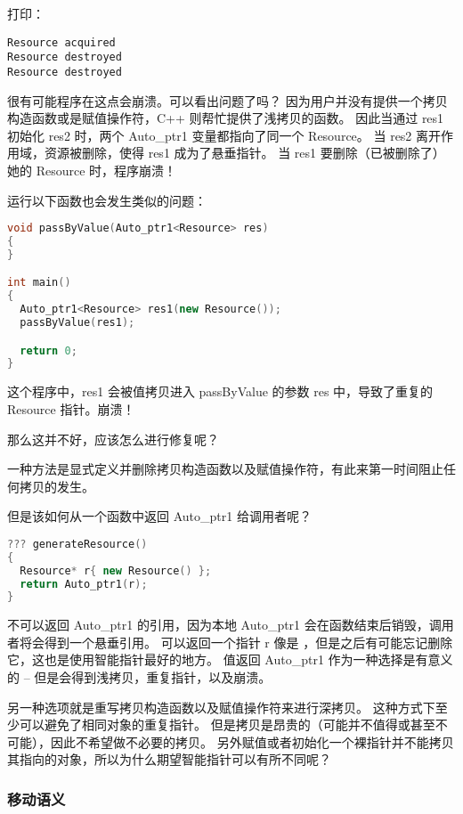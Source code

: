 \documentclass[../../LearnCpp.tex]{subfiles}
\begin{document}
打印：

\begin{lstlisting}
Resource acquired
Resource destroyed
Resource destroyed
\end{lstlisting}

很有可能程序在这点会崩溃。可以看出问题了吗？
因为用户并没有提供一个拷贝构造函数或是赋值操作符，C++ 则帮忙提供了浅拷贝的函数。
因此当通过 res1 初始化 res2 时，两个 Auto\_ptr1 变量都指向了同一个 Resource。
当 res2 离开作用域，资源被删除，使得 res1 成为了悬垂指针。
当 res1 要删除（已被删除了）她的 Resource 时，程序崩溃！

运行以下函数也会发生类似的问题：

\begin{lstlisting}[language=C++]
void passByValue(Auto_ptr1<Resource> res)
{
}

int main()
{
  Auto_ptr1<Resource> res1(new Resource());
  passByValue(res1);

  return 0;
}
\end{lstlisting}

这个程序中，res1 会被值拷贝进入 passByValue 的参数 res 中，导致了重复的 Resource 指针。崩溃！

那么这并不好，应该怎么进行修复呢？

一种方法是显式定义并删除拷贝构造函数以及赋值操作符，有此来第一时间阻止任何拷贝的发生。

但是该如何从一个函数中返回 Auto\_ptr1 给调用者呢？

\begin{lstlisting}[language=C++]
??? generateResource()
{
  Resource* r{ new Resource() };
  return Auto_ptr1(r);
}
\end{lstlisting}

不可以返回 Auto\_ptr1 的引用，因为本地 Auto\_ptr1 会在函数结束后销毁，调用者将会得到一个悬垂引用。
可以返回一个指针 r 像是 ，但是之后有可能忘记删除它，这也是使用智能指针最好的地方。
值返回 Auto\_ptr1 作为一种选择是有意义的 -- 但是会得到浅拷贝，重复指针，以及崩溃。

另一种选项就是重写拷贝构造函数以及赋值操作符来进行深拷贝。
这种方式下至少可以避免了相同对象的重复指针。
但是拷贝是昂贵的（可能并不值得或甚至不可能），因此不希望做不必要的拷贝。
另外赋值或者初始化一个裸指针并不能拷贝其指向的对象，所以为什么期望智能指针可以有所不同呢？

\subsubsection*{移动语义}
\end{document}
